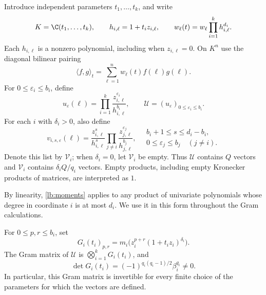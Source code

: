 Introduce independent parameters \(t_1,\ldots,t_k\), and write
\[
  K=\C(t_1,\ldots,t_k),\qquad
  h_{i,\ell}=1+t_i z_{i,\ell},\qquad
  w_\ell(t)=w_\ell\prod_{i=1}^{k}h_{i,\ell}^{d_i}.
\]
Each \(h_{i,\ell}\) is a nonzero polynomial, including when
\(z_{i,\ell}=0\).  On \(K^n\) use the diagonal bilinear pairing
\begin{equation}
  \langle f,g\rangle_t
     =\sum_{\ell=1}^{n}w_\ell(t)f(\ell)g(\ell).
  \label{lb:pairing}
\end{equation}
For \(0\leq\varepsilon_i\leq b_i\), define
\begin{equation}
  u_\varepsilon(\ell)
    =\prod_{i=1}^{k}
       \frac{z_{i,\ell}^{\varepsilon_i}}{h_{i,\ell}^{b_i}},
  \qquad
  \mathcal U=(u_\varepsilon)_{0\leq\varepsilon_i\leq b_i}.
  \label{lb:U}
\end{equation}
For each \(i\) with \(\delta_i>0\), also define
\begin{equation}
  v_{i,s,\varepsilon}(\ell)
    =\frac{z_{i,\ell}^{s}}{h_{i,\ell}^{s}}
       \prod_{j\neq i}
       \frac{z_{j,\ell}^{\varepsilon_j}}{h_{j,\ell}^{b_j}},
  \quad
  \begin{gathered}
    b_i+1\leq s\leq d_i-b_i,\\[-2pt]
    0\leq\varepsilon_j\leq b_j\quad(j\neq i).
  \end{gathered}
  \label{lb:V}
\end{equation}
Denote this list by \(\mathcal V_i\); when \(\delta_i=0\), let
\(\mathcal V_i\) be empty.  Thus \(\mathcal U\) contains \(Q\) vectors
and \(\mathcal V_i\) contains \(\delta_iQ/q_i\) vectors.  Empty products,
including empty Kronecker products of matrices, are interpreted as \(1\).

By linearity, \eqref{lb:moments} applies to any product of univariate
polynomials whose degree in coordinate \(i\) is at most \(d_i\).  We
use it in this form throughout the Gram calculations.

\begin{lemma}
\label{lb:U-gram}
For \(0\leq p,r\leq b_i\), set
\[
  G_i(t_i)_{p,r}
   =m_i\bigl(z_i^{p+r}(1+t_i z_i)^{\delta_i}\bigr).
\]
The Gram matrix of \(\mathcal U\) is
\(\bigotimes_{i=1}^{k}G_i(t_i)\), and
\begin{equation}
  \det G_i(t_i)
    =(-1)^{q_i(q_i-1)/2}\beta_i^{q_i}\neq 0.
  \label{lb:G-det}
\end{equation}
In particular, this Gram matrix is invertible for every finite choice
of the parameters for which the vectors are defined.
\end{lemma}


